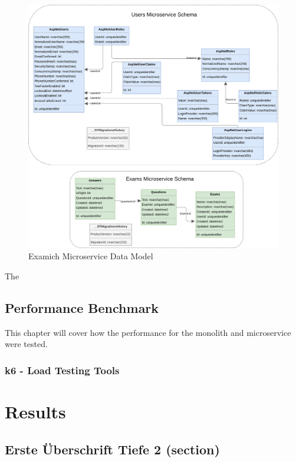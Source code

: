 \documentclass[MMR,Master,nenglish]{twbook}%
\begin{document}
\begin{figure} [H]
 \begin{center}
    \includegraphics[width=1\linewidth]{img/ExamichMicroserviceDataModel.png}
 \end{center}
 \caption{Examich Microservice Data Model}
 \label{datamodelmicroservice}
\end{figure}

The 



\section{Performance Benchmark}
This chapter will cover how the performance for the  monolith and microservice were tested.  

\subsection{k6 - Load Testing Tools}


\chapter{Results}

\section{Erste Überschrift Tiefe 2 (section)}
\end{document}
